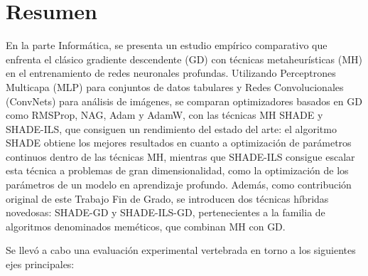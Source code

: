 \section*{Resumen}

En la parte Informática, se presenta un estudio empírico comparativo que enfrenta el clásico gradiente descendente (GD) con técnicas metaheurísticas (MH) en el entrenamiento de redes neuronales profundas. Utilizando Perceptrones Multicapa (MLP) para conjuntos de datos tabulares y Redes Convolucionales (ConvNets) para análisis de imágenes, se comparan optimizadores basados en GD como RMSProp, NAG, Adam y AdamW, con las técnicas MH SHADE y SHADE-ILS, que consiguen un rendimiento del estado del arte: el algoritmo SHADE obtiene los mejores resultados en cuanto a optimización de parámetros continuos dentro de las técnicas MH, mientras que SHADE-ILS consigue escalar esta técnica a problemas de gran dimensionalidad, como la optimización de los parámetros de un modelo en aprendizaje profundo\cite{MHtrainingClase}. Además, como contribución original de este Trabajo Fin de Grado, se introducen dos técnicas híbridas novedosas: SHADE-GD y SHADE-ILS-GD, pertenecientes a la familia de algoritmos denominados meméticos, que combinan MH con GD.

Se llevó a cabo una evaluación experimental vertebrada en torno a los siguientes ejes principales: 

